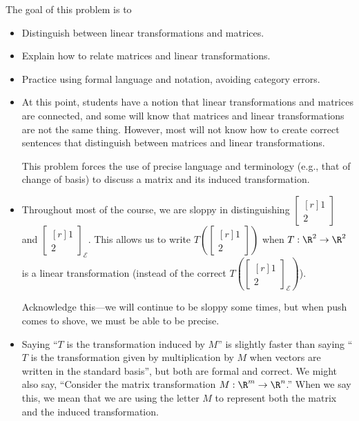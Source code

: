 \documentclass{problemset}
\newcommand{\mat}[1]{\begin{bmatrix*}[r]#1\end{bmatrix*}}
\begin{document}
	\question
	\begin{annotation}
		\begin{goals}

			The goal of this problem is to
			\begin{itemize}
				\item Distinguish between linear transformations and matrices.
				\item Explain how to relate matrices and linear transformations.
				\item Practice using formal language and notation, avoiding category errors.
			\end{itemize}
		\end{goals}

		\begin{notes}
			\begin{itemize}
				\item At this point, students have a notion that linear transformations
					and matrices are connected, and some will know that matrices and linear
					transformations are not the same thing. However, most will not know how to
					create correct sentences that distinguish between matrices and linear transformations.

					This problem forces the use of precise language and terminology (e.g., that of 
					change of basis) to discuss a matrix and its induced transformation.
				\item Throughout most of the course, we are sloppy in distinguishing $\mat{1\\2}$ and
					$\mat{1\\2}_{\mathcal E}$. This allows us to write $T\left(\mat{1\\2}\right)$ when $T:\R^2\to\R^2$
					is a linear transformation (instead of the correct $T\left(\mat{1\\2}_{\mathcal E}\right)$). 
					
					Acknowledge this---we will continue to be sloppy some times, but when push comes to
					shove, we must be able to be precise.
				\item Saying ``$T$ is the transformation induced by $M$'' is slightly faster
					than saying ``$T$ is the transformation given by multiplication by $M$ when
					vectors are written in the standard basis'',
					but both are formal and correct. We might also say, ``Consider the matrix transformation
					$M:\R^m\to\R^n$.'' When we say this, we mean that we are using the letter $M$ 
					to represent both the matrix and the induced transformation.
			\end{itemize}
		\end{notes}
	\end{annotation}
\end{document}
